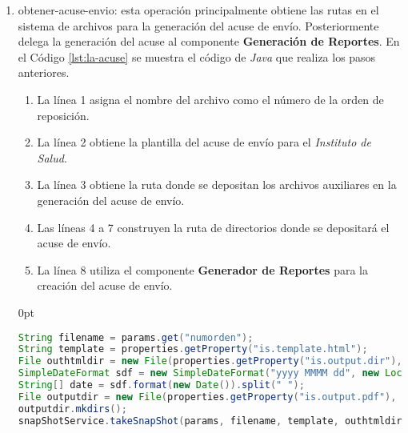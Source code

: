 \begin{enumerate}
	\item obtener-acuse-envio: esta operación principalmente obtiene las rutas en el sistema de archivos para la generación del acuse de envío. Posteriormente delega la generación del acuse al componente \textbf{Generación de Reportes}. En el Código \ref{lst:la-acuse} se muestra el código de \textit{Java} que realiza los pasos anteriores.
	\begin{enumerate}
		\item La línea 1 asigna el nombre del archivo como el número de la orden de reposición.
		\item La línea 2 obtiene la plantilla del acuse de envío para el \textit{Instituto de Salud}.
		\item La línea 3 obtiene la ruta donde se depositan los archivos auxiliares en la generación del acuse de envío.
		\item Las líneas 4 a 7 construyen la ruta de directorios donde se depositará el acuse de envío.
		\item La línea 8 utiliza el componente \textbf{Generador de Reportes} para la creación del acuse de envío.
	\end{enumerate}
	\begin{adjustwidth}{\listingfixwidth}{0pt}
	\begin{lstlisting}[language=Java, caption={Generación del acuse de envío.}, captionpos=b, label={lst:la-acuse}]
String filename = params.get("numorden");
String template = properties.getProperty("is.template.html");
File outhtmldir = new File(properties.getProperty("is.output.dir"), filename + ".html");
SimpleDateFormat sdf = new SimpleDateFormat("yyyy MMMM dd", new Locale("es", "MX"));
String[] date = sdf.format(new Date()).split(" ");
File outputdir = new File(properties.getProperty("is.output.pdf"), String.format(REPORT_DIR_TMPL, date[0], date[1], date[2]));
outputdir.mkdirs();
snapShotService.takeSnapShot(params, filename, template, outhtmldir, outputdir);
	\end{lstlisting}
	\end{adjustwidth}
\end{enumerate}

